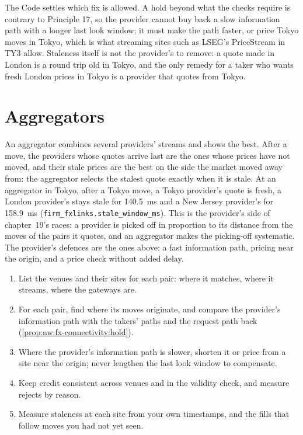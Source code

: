 The Code settles which fix is allowed. A hold beyond what the checks require is contrary to Principle 17, so the provider cannot buy
back a slow information path with a longer last look window; it must make the path faster, or price Tokyo moves in Tokyo, which is
what streaming sites such as LSEG's PriceStream in TY3 allow. Staleness itself is not the provider's to remove: a quote made in
London is a round trip old in Tokyo, and the only remedy for a taker who wants fresh London prices in Tokyo is a provider that quotes
from Tokyo.

\section{Aggregators}

An aggregator combines several providers' streams and shows the best. After a move, the providers whose quotes arrive last are the
ones whose prices have not moved, and their stale prices are the best on the side the market moved away from: the aggregator selects
the stalest quote exactly when it is stale. At an aggregator in Tokyo, after a Tokyo move, a Tokyo provider's quote is fresh, a London
provider's stays stale for \qty{140.5}{\milli\second} and a New Jersey provider's for \qty{158.9}{\milli\second}
(\texttt{firm\_fxlinks.stale\_window\_ms}). This is the provider's side of chapter~19's races: a provider
is picked off in proportion to its distance from the moves of the pairs it quotes, and an aggregator makes the picking-off
systematic. The provider's defences are the ones above: a fast information path, pricing near the origin, and a price check without
added delay.

\begin{method}\label{met:nw:fx-connectivity:lp}
\begin{enumerate}
\item List the venues and their sites for each pair: where it matches, where it streams, where the gateways are.
\item For each pair, find where its moves originate, and compare the provider's information path with the takers' paths and the
  request path back (\cref{prop:nw:fx-connectivity:hold}).
\item Where the provider's information path is slower, shorten it or price from a site near the origin; never lengthen the last look
  window to compensate.
\item Keep credit consistent across venues and in the validity check, and measure rejects by reason.
\item Measure staleness at each site from your own timestamps, and the fills that follow moves you had not yet seen.
\end{enumerate}
\end{method}

